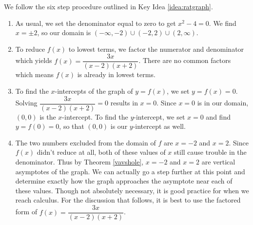 {We follow the six step procedure outlined in Key Idea \ref{idea:ratgraph}.

\begin{enumerate}

\item  As usual, we set the denominator equal to zero to get $x^2 - 4 = 0$.  We find $x = \pm 2$, so our domain is $(-\infty, -2) \cup (-2,2) \cup (2,\infty)$.

\item  To reduce $f(x)$ to lowest terms, we factor the numerator and denominator which yields $f(x) = \dfrac{3x}{(x-2)(x+2)}$.  There are no common factors which means $f(x)$ is already in lowest terms.

\item  To find the $x$-intercepts of the graph of $y=f(x)$, we set $y=f(x) = 0$.  Solving $ \dfrac{3x}{(x-2)(x+2)} = 0$ results in $x=0$.  Since $x=0$ is in our domain, $(0,0)$ is the $x$-intercept.  To find the $y$-intercept, we set $x=0$ and find $y = f(0) = 0$, so that $(0,0)$ is our $y$-intercept as well.


\item  The two numbers excluded from the domain of $f$ are $x = -2$ and $x=2$.  Since $f(x)$ didn't reduce at all, both of these values of $x$ still cause trouble in the denominator. Thus by Theorem \ref{vavshole}, $x=-2$ and $x=2$ are vertical asymptotes of the graph.  We can actually go a step further at this point and determine exactly how the graph approaches the asymptote near each of these values. Though not absolutely necessary, it is good practice for when we reach calculus.  For the discussion that follows, it is best to use the factored form of $f(x) = \dfrac{3x}{(x-2)(x+2)}$.



\end{enumerate}}
